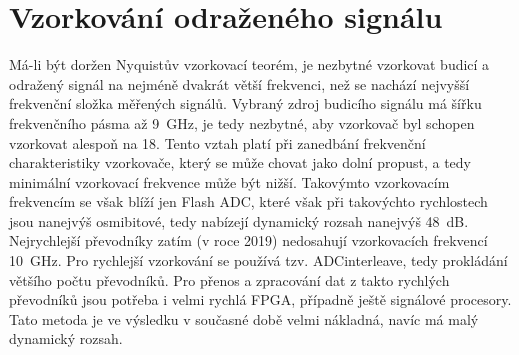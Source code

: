 \chapter{Vzorkování odraženého signálu}
Má-li být doržen Nyquistův vzorkovací teorém, je nezbytné vzorkovat budicí a odražený signál na nejméně dvakrát větší frekvenci, než se nachází nejvyšší frekvenční složka měřených signálů. Vybraný zdroj budicího signálu má šířku frekvenčního pásma až \SI{9}{\giga\hertz}, je tedy nezbytné, aby vzorkovač byl schopen vzorkovat alespoň na \SI{18}{\gigasample}. Tento vztah platí při zanedbání frekvenční charakteristiky vzorkovače, který se může chovat jako dolní propust, a tedy minimální vzorkovací frekvence může být nižší. Takovýmto vzorkovacím frekvencím se však blíží jen Flash \acrshort{ADC}, které však při takovýchto rychlostech jsou nanejvýš osmibitové, tedy nabízejí dynamický rozsah nanejvýš \SI{48}{\deci\bel}. Nejrychlejší převodníky zatím (v roce 2019) nedosahují vzorkovacích frekvencí \SI{10}{\giga\hertz}. Pro rychlejší vzorkování se používá tzv. \gls{ADCinterleave}, tedy prokládání většího počtu převodníků. Pro přenos a zpracování dat z takto rychlých převodníků jsou potřeba i velmi rychlá FPGA, případně ještě signálové procesory. Tato metoda je ve výsledku v současné době velmi nákladná, navíc má malý dynamický rozsah.

